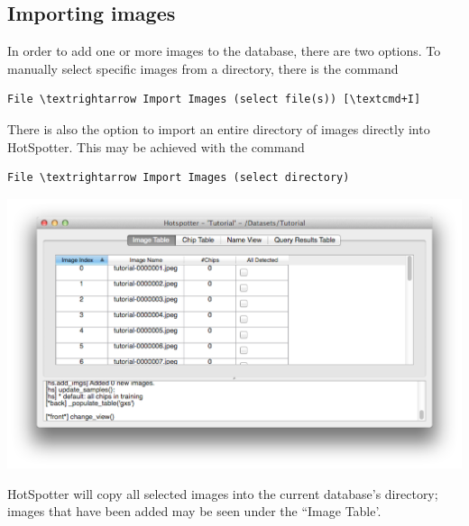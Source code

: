 \documentclass[a4paper,10pt]{article}
\begin{document}
    \subsection{Importing images}
        In order to add one or more images to the database, there are two options. To manually select specific images from a directory, there is the command
        \begin{Verbatim}[commandchars=\\\{\}]
        File \textrightarrow Import Images (select file(s)) [\textcmd+I]
        \end{Verbatim}
        There is also the option to import an entire directory of images directly into HotSpotter.  This may be achieved with the command 
        \begin{Verbatim}[commandchars=\\\{\}]
        File \textrightarrow Import Images (select directory)
        \end{Verbatim}
        \begin{center}
            \includegraphics[scale=0.15]{images/added.png}
        \end{center}
        HotSpotter will copy all selected images into the current database's directory; images that have been added may be seen under the ``Image Table'.
\end{document}
